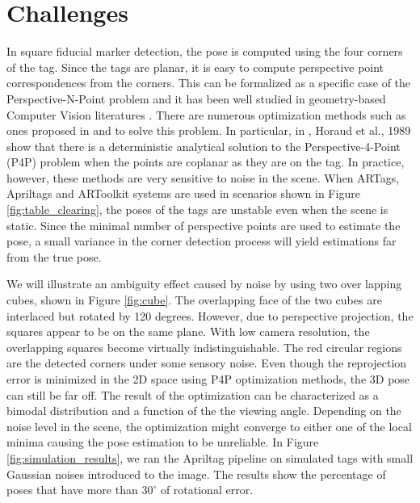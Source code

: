 \section{Challenges}
\label{sec:problem}


In square fiducial marker detection, the pose is computed using the four corners of the tag. Since the tags are planar, it is easy to compute perspective point correspondences from the corners. This can be formalized as a specific case of the Perspective-N-Point problem and it has been well studied in geometry-based Computer Vision literatures \citep{hartley2003multiple, zhang2005general}. There are numerous optimization methods such as ones proposed in \citep{dementhon1992exact} and \citep{haralick1994review} to solve this problem. In particular, in \citep{horaud1989analytic}, Horaud et al., 1989 show that there is a deterministic analytical solution to the Perspective-4-Point (P4P) problem when the points are coplanar as they are on the tag.  In practice, however, these methods are very sensitive to noise in the scene. When ARTags, Apriltags and ARToolkit systems are used in scenarios shown in Figure \ref{fig:table_clearing}, the poses of the tags are unstable even when the scene is static. Since the minimal number of perspective points are used to estimate the pose, a small variance in the corner detection process will yield estimations far from the true pose. 

We will illustrate an ambiguity effect caused by noise by using two over lapping cubes, shown in Figure \ref{fig:cube}. The overlapping face of the two cubes are interlaced but rotated by 120 degrees. However, due to perspective projection, the squares appear to be on the same plane. With low camera resolution, the overlapping squares become virtually indistinguishable. The red circular regions are the detected corners under some sensory noise. Even though the reprojection error is minimized in the 2D space using P4P optimization methods, the 3D pose can still be far off. The result of the optimization can be characterized as a bimodal distribution and a function of the the viewing angle. Depending on the noise level in the scene, the optimization might converge to either one of the local minima causing the pose estimation to be unreliable. In Figure \ref{fig:simulation_results}, we ran the Apriltag pipeline on simulated tags with small Gaussian noises introduced to the image. The results show the percentage of poses that have more than $30^{\circ}$ of rotational error.